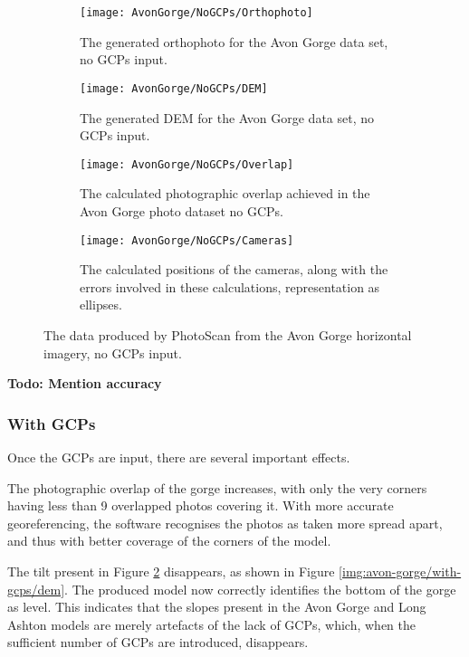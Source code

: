 \begin{figure}
    \centering
    \begin{subfigure}[b]{0.24\textwidth}
        \texttt{[image: AvonGorge/NoGCPs/Orthophoto]}
        \caption{The generated orthophoto for the Avon Gorge data set, no
        GCPs input.}
        \label{img:avon-gorge/no-gcps/orthophoto}
    \end{subfigure}
    \begin{subfigure}[b]{0.24\textwidth}
        \texttt{[image: AvonGorge/NoGCPs/DEM]}
        \caption{The generated DEM for the Avon Gorge data set, no GCPs input.}
        \label{img:avon-gorge/no-gcps/dem}
    \end{subfigure}
    \begin{subfigure}[b]{0.24\textwidth}
        \texttt{[image: AvonGorge/NoGCPs/Overlap]}
        \caption{The calculated photographic overlap achieved in the Avon Gorge
        photo dataset no GCPs.}
        \label{img:avon-gorge/no-gcps/overlap}
    \end{subfigure}
    \begin{subfigure}[b]{0.24\textwidth}
        \texttt{[image: AvonGorge/NoGCPs/Cameras]}
        \caption{The calculated positions of the cameras, along with the errors
        involved in these calculations, representation as ellipses.}
        \label{img:avon-gorge/no-gcps/cameras}
    \end{subfigure}
    \caption{The data produced by PhotoScan from the Avon Gorge horizontal
    imagery, no GCPs input.}
    \label{img:avon-gorge/no-gcps}
\end{figure}

\textbf{Todo: Mention accuracy} \\

\subsubsection{With GCPs}
\label{sec:results/avon-gorge/with-gcps}

Once the GCPs are input, there are several important effects.

The photographic overlap of the gorge increases, with only the very corners
having less than 9 overlapped photos covering it. With more accurate
georeferencing, the software recognises the photos as taken more spread apart,
and thus with better coverage of the corners of the model.

The tilt present in Figure \ref{img:avon-gorge/no-gcps/dem} disappears, as shown
in Figure \ref{img:avon-gorge/with-gcps/dem}. The produced model now correctly
identifies the bottom of the gorge as level. This indicates that the slopes
present in the Avon Gorge and Long Ashton models are merely artefacts of the
lack of GCPs, which, when the sufficient number of GCPs are introduced,
disappears.

